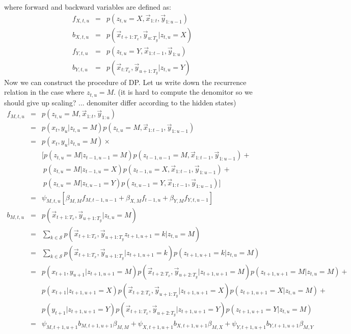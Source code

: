 where forward and backward variables are defined as:
\begin{eqnarray}
  f_{X, t, u} &=& p(z_{t, u}=X , \vec{x}_{1:t}, \vec{y}_{1:u-1}) \\
  b_{X, t, u} &=& p(\vec{x}_{t+1:T_x}, \vec{y}_{u:T_y} | z_{t, u}= X)  \\
  f_{Y, t, u} &=& p(z_{t, u}=Y , \vec{x}_{1:t-1}, \vec{y}_{1:u}) \\
  b_{Y, t, u} &=& p(\vec{x}_{t:T_x}, \vec{y}_{u+1:T_y} | z_{t, u}= Y) 
\end{eqnarray}
Now we can construct the procedure of DP. Let us write down the recurrence relation in the case where $z_{t,u} = M$. (it is hard to compute the denomitor so we should give up scaling? ... denomiter differ according to the hidden states)
\begin{eqnarray}
f_{M, t, u} &=& p(z_{t, u}=M , \vec{x}_{1:t}, \vec{y}_{1:u}) \nonumber \\
            &=& p(x_t, y_u |z_{t, u}=M) p(z_{t, u}=M, \vec{x}_{1:t-1}, \vec{y}_{1:u-1}) \nonumber \\
            &=& p(x_t, y_u |z_{t, u}=M) \times \nonumber \\
&&\big[p(z_{t, u}=M| z_{t-1, u-1} = M) p(z_{t-1,u-1} = M, \vec{x}_{1:t-1}, \vec{y}_{1:u-1}) + \nonumber \\
&&\ p(z_{t, u}=M| z_{t-1, u} = X)p(z_{t-1,u} = X , \vec{x}_{1:t-1}, \vec{y}_{1:u-1}) + \nonumber \\
&&\ p(z_{t, u}=M| z_{t, u-1} = Y)p(z_{t,u-1} = Y , \vec{x}_{1:t-1}, \vec{y}_{1:u-1})  \big]\nonumber \\
&=& \psi_{M, t, u} [\beta_{M,M} f_{M,t-1,u-1} + \beta_{X,M} f_{t-1, u} + \beta_{Y,M} f_{Y, t, u-1}]\\
  b_{M, t, u}
            &=& p(\vec{x}_{t+1:T_x}, \vec{y}_{u+1:T_y} | z_{t, u}= M) \nonumber \\
            &=& \sum_{k \in \mathcal{S}}p(\vec{x}_{t+1:T_x}, \vec{y}_{u+1:T_y} z_{t+1, u+1} = k| z_{t, u}= M) \nonumber\\
            &=& \sum_{k \in \mathcal{S}}p(\vec{x}_{t+1:T_x}, \vec{y}_{u+1:T_y}|z_{t+1, u+1}=k) p(z_{t+1, u+1} = k| z_{t, u}= M)\nonumber \\ 
            &=& p(x_{t+1}, y_{u+1}|z_{t+1, u+1}=M)p(\vec{x}_{t+2:T_x}, \vec{y}_{u+2:T_y}|z_{t+1, u+1}=M) p(z_{t+1, u+1} = M| z_{t, u}= M) +\nonumber \\ 
            && p(x_{t+1}|z_{t+1, u+1}=X)p(\vec{x}_{t+2:T_x}, \vec{y}_{u+1:T_y}|z_{t+1, u+1}=X) p(z_{t+1, u+1} = X| z_{t, u}= M) + \nonumber \\ 
            && p(y_{t+1}|z_{t+1, u+1}=Y)p(\vec{x}_{t+1:T_x}, \vec{y}_{u+2:T_y}|z_{t+1, u+1}=Y) p(z_{t+1, u+1} = Y| z_{t, u}= M) \nonumber \\ 
            &=& \psi_{M, t+1, u+1} b_{M, t+1, u+1} \beta_{M,M} + \psi_{X, t+1, u+1} b_{X, t+1, u+1} \beta_{M,X} + \psi_{Y, t+1, u+1} b_{Y, t+1, u+1} \beta_{M,Y}
\end{eqnarray}
